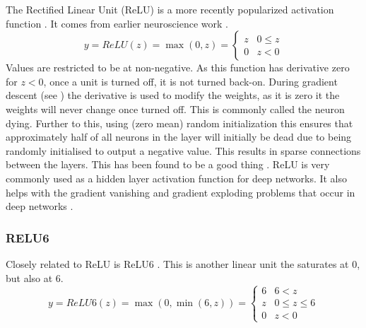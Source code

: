 \documentclass[12pt,parskip]{komatufte}
\begin{document}
The Rectified Linear Unit (ReLU) is a more recently popularized activation function .
It comes from earlier neuroscience work .
\begin{equation}
y=ReLU(z)=\max \left( 0, z \right)=\begin{cases}
z & 0\le z\\
0 & z<0
\end{cases}
\end{equation}
Values are restricted to be at non-negative.
As this function has derivative zero for $z<0$, once a unit is turned off, it is not turned back-on.
During gradient descent (see ) the derivative is used to modify the weights, as it is zero it the weights will never change once turned off.
This is commonly called the neuron dying.
Further to this, using (zero mean) random initialization this ensures that approximately half of all neurons in the layer will initially be dead due to being randomly initialised to output a negative value.
This results in sparse connections between the layers.
This has been found to be a good thing .
ReLU is very commonly used as a hidden layer activation function for deep networks.
It also helps with the gradient vanishing and gradient exploding problems that occur in deep networks \parencite{glorot2011deepRELUsparse}.


\subsubsection{RELU6}


Closely related to ReLU is ReLU6 .
This is another linear unit the saturates at 0, but also at 6.
\begin{equation}
y=ReLU6(z)=\max \left(0, \min\left(6, z\right) \right) =  \begin{cases}
6 & 6<z\\
z & 0\le z\le6\\
0 & z<0
\end{cases}
\end{equation}
\end{document}
